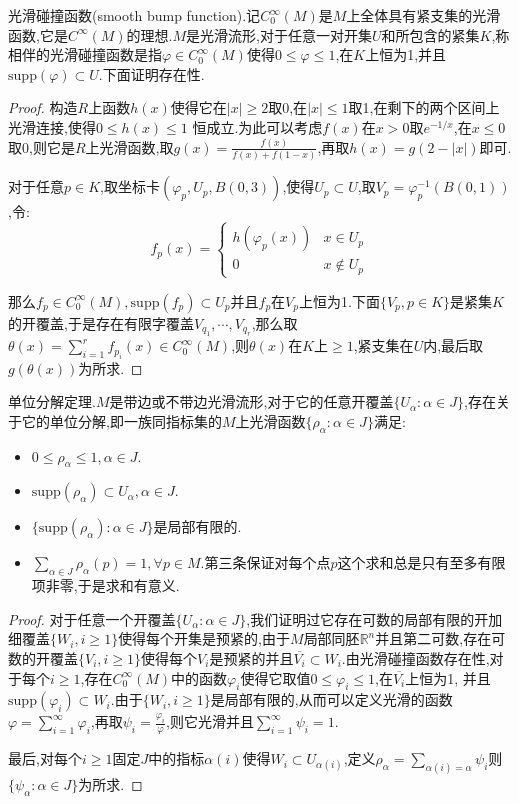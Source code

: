 光滑碰撞函数(smooth bump function).记$C^{\infty}_0(M)$是$M$上全体具有紧支集的光滑函数,它是$C^{\infty}(M)$的理想.$M$是光滑流形,对于任意一对开集$U$和所包含的紧集$K$,称相伴的光滑碰撞函数是指$\varphi\in C^{\infty}_0(M)$使得$0\le \varphi\le1$,在$K$上恒为1,并且$\mathrm{supp}(\varphi)\subset U$.下面证明存在性.
\begin{proof}
	
	构造$R$上函数$h(x)$使得它在$|x|\ge2$取0,在$|x|\le1$取1,在剩下的两个区间上光滑连接,使得$0\le h(x)\le1$ 恒成立.为此可以考虑$f(x)$在$x>0$取$e^ {-1/x}$,在$x\le0$ 取0,则它是$R$上光滑函数,取$g(x)=\frac{f(x)} {f(x)+f(1-x)}$,再取$h(x)=g(2-|x|)$即可.
	
	\qquad
	
	对于任意$p\in K$,取坐标卡$(\varphi_p,U_p,B(0,3))$,使得$U_p\subset U$,取$V_p=\varphi_p^{-1}(B(0,1))$,令:
	$$f_p(x)=\left\{\begin{array}{cc}
	h(\varphi_p(x))   & x\in U_p\\
	0  &  x\not\in U_p\end{array}\right.$$
	
	那么$f_p\in C^{\infty}_0(M),\mathrm{supp}(f_p)\subset U_p$并且$f_p$在$V_p$上恒为1.下面$\{V_p,p\in K\}$是紧集$K$的开覆盖,于是存在有限字覆盖$V_ {q_1},\cdots,V_{q_r}$,那么取$\theta(x)=\sum_{i=1}^rf_{p_i}(x)\in C^{\infty}_0(M)$,则$\theta(x)$在$K$上$\ge1$,紧支集在$U$内,最后取$g(\theta(x))$为所求.
\end{proof}

单位分解定理.$M$是带边或不带边光滑流形,对于它的任意开覆盖$\{U_{\alpha}:\alpha\in J\}$,存在关于它的单位分解,即一族同指标集的$M$上光滑函数$\{\rho_{\alpha}:\alpha\in J\}$满足:
\begin{itemize}
	\item $0\le\rho_{\alpha}\le1,\alpha\in J$.
	\item $\mathrm{supp}(\rho_{\alpha})\subset U_{\alpha},\alpha\in J$.
	\item $\{\mathrm{supp}(\rho_{\alpha}):\alpha\in J\}$是局部有限的.
	\item $\sum_{\alpha\in J}\rho_{\alpha}(p)=1,\forall p\in M$.第三条保证对每个点$p$这个求和总是只有至多有限项非零,于是求和有意义.
\end{itemize}
\begin{proof}
	
	对于任意一个开覆盖$\{U_{\alpha}:\alpha\in J\}$,我们证明过它存在可数的局部有限的开加细覆盖$\{W_i,i\ge1\}$使得每个开集是预紧的,由于$M$局部同胚$\mathbb{R}^n$并且第二可数,存在可数的开覆盖$\{V_i,i\ge1\}$使得每个$V_i$是预紧的并且$\overline{V_i}\subset W_i$.由光滑碰撞函数存在性,对于每个$i\ge1$,存在$C^{\infty}_0(M)$中的函数$\varphi_i$使得它取值$0\le\varphi_i\le1$,在$\overline{V_i}$上恒为1, 并且$\mathrm{supp}(\varphi_i)\subset W_i$.由于$\{W_i,i\ge1\}$是局部有限的,从而可以定义光滑的函数$\varphi=\sum_{i=1}^{\infty}\varphi_i$,再取$\psi_i=\frac{\varphi_i}{\varphi}$,则它光滑并且$\sum_ {i=1}^{\infty}\psi_i=1$.
	
	\qquad
	
	最后,对每个$i\ge1$固定$J$中的指标$\alpha(i)$使得$W_i\subset U_{\alpha(i)}$,定义$\rho_{\alpha}=\sum_{\alpha(i)=\alpha}\psi_i$则$\{\psi_{\alpha}:\alpha\in J\}$为所求.
\end{proof}

